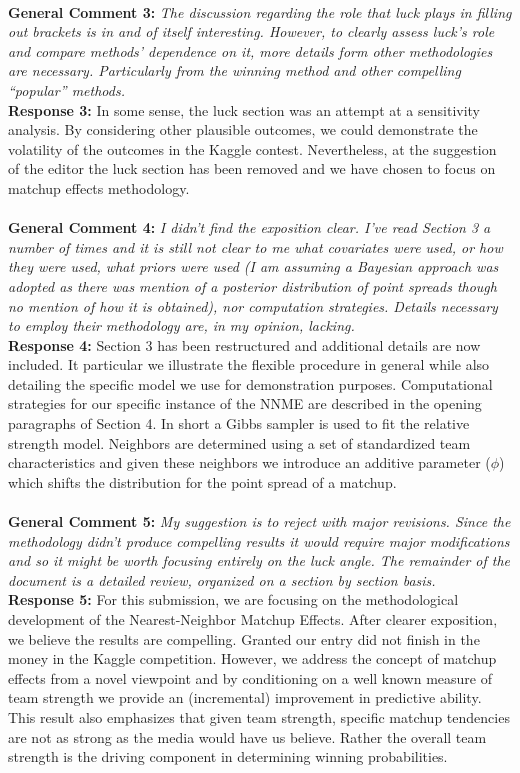 \documentclass[11pt]{article} %
\begin{document}
\\
{\bf General Comment 3:} \emph{The discussion regarding the role that luck plays in filling out brackets is in and of itself interesting. However, to clearly assess luck's role and compare methods' dependence on it, more details form other methodologies are necessary. Particularly from the winning method and other compelling ``popular'' methods.}\\
{\bf Response 3:} In some sense, the luck section was an attempt at a sensitivity analysis. By considering other plausible outcomes, we could demonstrate the volatility of the outcomes in the Kaggle contest. Nevertheless, at the suggestion of the editor the luck section has been removed and we have chosen to focus on matchup effects methodology.\\
\\
{\bf General Comment 4:} \emph{I didn't find the exposition clear. I've read Section 3 a number of times and it is still not clear to me what covariates were used, or how they were used, what priors were used (I am assuming a Bayesian approach was adopted as there was mention of a posterior distribution of point spreads though no mention of how it is obtained), nor computation strategies. Details necessary to employ their methodology are, in my opinion, lacking.}\\
{\bf Response 4:} Section 3 has been restructured and additional details are now included. It particular we illustrate the flexible procedure in general while also detailing the specific model we use for demonstration purposes. Computational strategies for our specific instance of the NNME are described in the opening paragraphs of Section 4. In short a Gibbs sampler is used to fit the relative strength model. Neighbors are determined using a set of standardized team characteristics and given these neighbors we introduce an additive parameter ($\phi$) which shifts the distribution for the point spread of a matchup.\\
\\
{\bf General Comment 5:} \emph{My suggestion is to reject with major revisions. Since the methodology didn't produce compelling results it would require major modifications and so it might be worth focusing entirely on the luck angle. The remainder of the document is a detailed review, organized on a section by section basis.}\\
{\bf Response 5:} For this submission, we are focusing on the methodological development of the Nearest-Neighbor Matchup Effects. After clearer exposition, we believe the results are compelling. Granted our entry did not finish in the money in the Kaggle competition. However, we address the concept of matchup effects from a novel viewpoint and by conditioning on a well known measure of team strength we provide an (incremental) improvement in predictive ability. This result also emphasizes that given team strength, specific matchup tendencies are not as strong as the media would have us believe. Rather the overall team strength is the driving component in determining winning probabilities.\\ 
\end{document}
